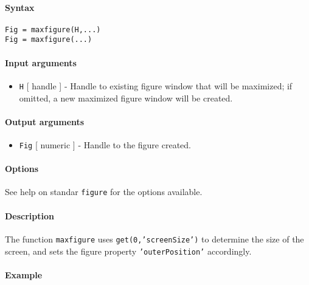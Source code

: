 


	\paragraph{Syntax}\label{syntax}

\begin{verbatim}
Fig = maxfigure(H,...)
Fig = maxfigure(...)
\end{verbatim}

\paragraph{Input arguments}\label{input-arguments}

\begin{itemize}
\itemsep1pt\parskip0pt
\item
  \texttt{H} {[} handle {]} - Handle to existing figure window that will
  be maximized; if omitted, a new maximized figure window will be
  created.
\end{itemize}

\paragraph{Output arguments}\label{output-arguments}

\begin{itemize}
\itemsep1pt\parskip0pt
\item
  \texttt{Fig} {[} numeric {]} - Handle to the figure created.
\end{itemize}

\paragraph{Options}\label{options}

See help on standar \texttt{figure} for the options available.

\paragraph{Description}\label{description}

The function \texttt{maxfigure} uses \texttt{get(0,'screenSize')} to
determine the size of the screen, and sets the figure property
\texttt{'outerPosition'} accordingly.

\paragraph{Example}\label{example}


